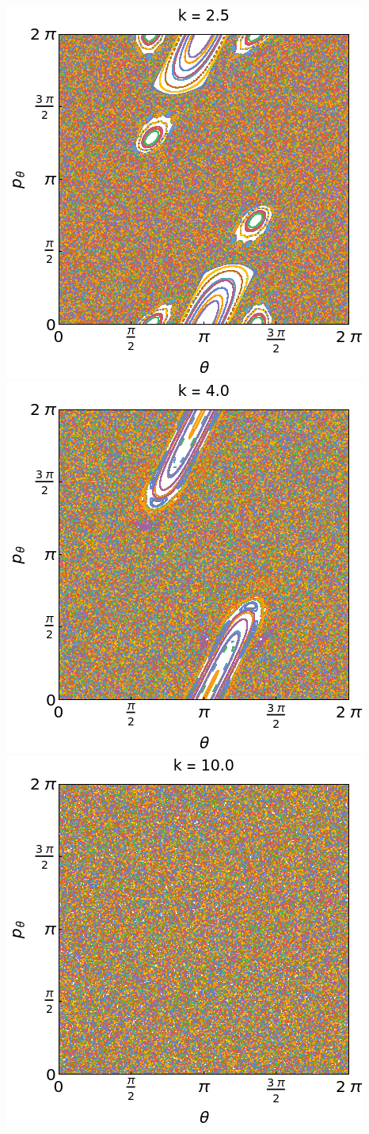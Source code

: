\documentclass[aspectratio=169,xcolor=dvipsnames,7pt]{beamer}
\begin{document}
\begin{frame}
\begin{columns}
\begin{column}{0.59\textwidth}
{			\includegraphics[width=.32\textwidth]{k_2_5.png}
			\includegraphics[width=.32\textwidth]{k_4_0.png}
			\includegraphics[width=.32\textwidth]{k_10_0.png}
			}
			
\end{column}
\end{columns}
\end{frame}
\end{document}
